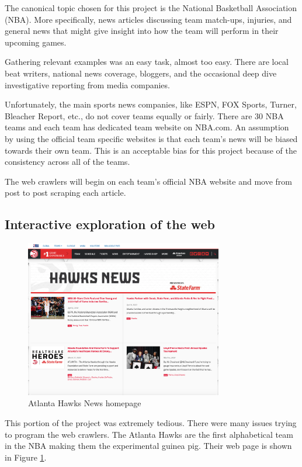 \documentclass[5p,authoryear]{elsarticle}
\begin{document}
The canonical topic chosen for this project is the National Basketball Association (NBA). More specifically, news articles discussing team match-ups, injuries, and general news that might give insight into how the team will perform in their upcoming games. 

Gathering relevant examples was an easy task, almost too easy. There are local beat writers, national news coverage, bloggers, and the occasional deep dive investigative reporting from media companies. 

Unfortunately, the main sports news companies, like ESPN, FOX Sports, Turner, Bleacher Report, etc., do not cover teams equally or fairly. There are 30 NBA teams and each team has dedicated team website on NBA.com. An assumption by using the official team specific websites is that each team's news will be biased towards their own team. This is an acceptable bias for this project because of the consistency across all of the teams.

The web crawlers will begin on each team's official NBA website and move from post to post scraping each article. 



\subsection{Interactive exploration of the web}\label{exploration}

\begin{figure}[!htb] \centering
	\includegraphics[width=3.4in]{figures/Hawks_News.png}
	\caption[]{Atlanta Hawks News homepage} 
	\label{hawks news} 
\end{figure}

This portion of the project was extremely tedious. There were many issues trying to program the web crawlers. The Atlanta Hawks are the first alphabetical team in the NBA making them the experimental guinea pig. Their web page is shown in Figure \ref{hawks news}. 
\end{document}
